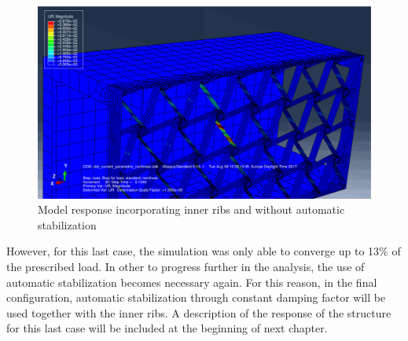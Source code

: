     \begin{figure}[!htpb]
      \centering
      \includegraphics[width=0.8 \textwidth]{../figures/result-model/normalCaseNoDamp2InnerRibs_800N}
      \caption[Model response incorporating inner ribs and without automatic stabilization]{Model response incorporating inner ribs and without automatic stabilization}
      \label{fig:normalCaseNoDamp2InnerRibs}
    \end{figure}

    However, for this last case, the simulation was only able to converge up to 13\% of the prescribed load. In other to progress further in the analysis, the use of automatic stabilization becomes necessary again. For this reason, in the final configuration, automatic stabilization through constant damping factor will be used together with the inner ribs. A description of the response of the structure for this last case will be included at the beginning of next chapter.